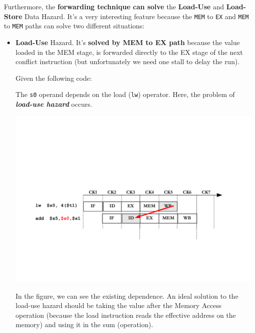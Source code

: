 \documentclass[a4paper]{article}
\begin{document}
    \noindent
    Furthermore, the \textbf{forwarding technique can solve} the \textbf{Load-Use} and \textbf{Load-Store} Data Hazard. It's a very interesting feature because the \texttt{MEM} to \texttt{EX} and \texttt{MEM} to \texttt{MEM} paths can solve two different situations:
    \begin{itemize}
        \item \textbf{Load-Use} Hazard. It's \textbf{solved by MEM to EX path} because the value loaded in the MEM stage, is forwarded directly to the EX stage of the next conflict instruction (but unfortunately we need one stall to delay the run).

        \begin{examplebox}
            Given the following code:
            
            The \texttt{s0} operand depends on the load (\texttt{lw}) operator. Here, the problem of \textbf{\emph{load-use hazard}} occurs.
            \begin{center}
                \includegraphics[width=\textwidth]{img/load-use-hazard-problem-1.pdf}
            \end{center}
            In the figure, we can see the existing dependence. An ideal solution to the load-use hazard should be taking the value after the Memory Access operation (because the load instruction reads the effective address on the memory) and using it in the sum (operation).


\end{examplebox}
\end{itemize}
\end{document}
